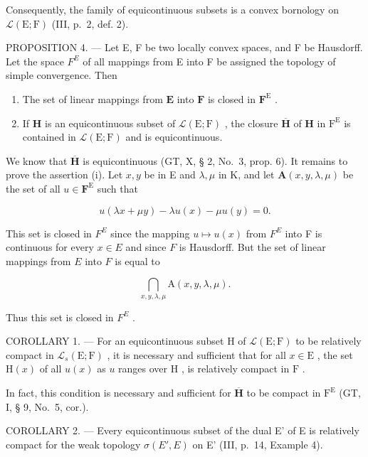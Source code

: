 Consequently, the family of equicontinuous subsets is a convex bornology on \(\mathcal{L}(\mathrm{E};\mathrm{F})\) (III, p.~2, def. 2).

PROPOSITION 4. --- Let E, F be two locally convex spaces, and F be Hausdorff. Let the space \(F^{E}\) of all mappings from E into F be assigned the topology of simple convergence. Then

\begin{enumerate}
\def\labelenumi{(\roman{enumi})}
\item
  The set of linear mappings from \(\mathbf{E}\) into \(\mathbf{F}\) is closed in \(\mathbf{F}^{\mathrm{E}}\) .
\item
  If \(\mathbf{H}\) is an equicontinuous subset of \(\mathcal{L}(\mathrm{E};\mathrm{F})\) , the closure \(\overline{\mathbf{H}}\) of \(\mathbf{H}\) in \(\mathrm{F}^{\mathrm{E}}\) is contained in \(\mathcal{L}(\mathrm{E};\mathrm{F})\) and is equicontinuous.
\end{enumerate}

We know that \(\overline{\mathbf{H}}\) is equicontinuous (GT, X, § 2, No.~3, prop. 6). It remains to prove the assertion (i). Let \(x, y\) be in E and \(\lambda, \mu\) in K, and let \(\mathbf{A}(x, y, \lambda, \mu)\) be the set of all \(u \in \mathbf{F}^{\mathrm{E}}\) such that

\[
u (\lambda x + \mu y) - \lambda u (x) - \mu u (y) = 0.
\]

This set is closed in \(F^{E}\) since the mapping \(u \mapsto u(x)\) from \(F^{E}\) into F is continuous for every \(x \in E\) and since \(F\) is Hausdorff. But the set of linear mappings from \(E\) into \(F\) is equal to

\[
\bigcap_ {x, y, \lambda , \mu} \mathrm{A} (x, y, \lambda , \mu).
\]

Thus this set is closed in \(F^{E}\) .

COROLLARY 1. --- For an equicontinuous subset H of \(\mathcal{L}(\mathrm{E};\mathrm{F})\) to be relatively compact in \(\mathcal{L}_s(\mathrm{E};\mathrm{F})\) , it is necessary and sufficient that for all \(x\in \mathrm{E}\) , the set \(\mathrm{H}(x)\) of all \(u(x)\) as \(u\) ranges over \(\mathrm{H}\) , is relatively compact in \(\mathrm{F}\) .

In fact, this condition is necessary and sufficient for \(\overline{\mathbf{H}}\) to be compact in \(\mathrm{F}^{\mathrm{E}}\) (GT, I, § 9, No.~5, cor.).

COROLLARY 2. --- Every equicontinuous subset of the dual E' of E is relatively compact for the weak topology \(\sigma(E', E)\) on E' (III, p.~14, Example 4).

